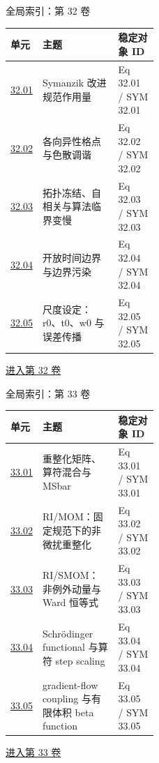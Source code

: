\documentclass[aspectratio=169,10pt]{ctexbeamer}
\begin{document}
\begin{frame}[t]{全局索引：第 32 卷}
\small\begin{tabularx}{\linewidth}{p{0.15\linewidth}Yp{0.27\linewidth}}
\toprule 单元 & 主题 & 稳定对象 ID\\\midrule
\hyperlink{Fr:32.01-1}{32.01} & Symanzik 改进规范作用量 & Eq 32.01 / SYM 32.01\\
\hyperlink{Fr:32.02-1}{32.02} & 各向异性格点与色散调谐 & Eq 32.02 / SYM 32.02\\
\hyperlink{Fr:32.03-1}{32.03} & 拓扑冻结、自相关与算法临界变慢 & Eq 32.03 / SYM 32.03\\
\hyperlink{Fr:32.04-1}{32.04} & 开放时间边界与边界污染 & Eq 32.04 / SYM 32.04\\
\hyperlink{Fr:32.05-1}{32.05} & 尺度设定：r0、t0、w0 与误差传播 & Eq 32.05 / SYM 32.05\\
\bottomrule\end{tabularx}
\vfill\hyperlink{Fr:V32-title}{进入第 32 卷}
\end{frame}

\begin{frame}[t]{全局索引：第 33 卷}
\small\begin{tabularx}{\linewidth}{p{0.15\linewidth}Yp{0.27\linewidth}}
\toprule 单元 & 主题 & 稳定对象 ID\\\midrule
\hyperlink{Fr:33.01-1}{33.01} & 重整化矩阵、算符混合与 MSbar & Eq 33.01 / SYM 33.01\\
\hyperlink{Fr:33.02-1}{33.02} & RI/\allowbreak{}MOM：固定规范下的非微扰重整化 & Eq 33.02 / SYM 33.02\\
\hyperlink{Fr:33.03-1}{33.03} & RI/\allowbreak{}SMOM：非例外动量与 Ward 恒等式 & Eq 33.03 / SYM 33.03\\
\hyperlink{Fr:33.04-1}{33.04} & Schrödinger functional 与算符 step scaling & Eq 33.04 / SYM 33.04\\
\hyperlink{Fr:33.05-1}{33.05} & gradient-flow coupling 与有限体积 beta function & Eq 33.05 / SYM 33.05\\
\bottomrule\end{tabularx}
\vfill\hyperlink{Fr:V33-title}{进入第 33 卷}
\end{frame}
\end{document}
